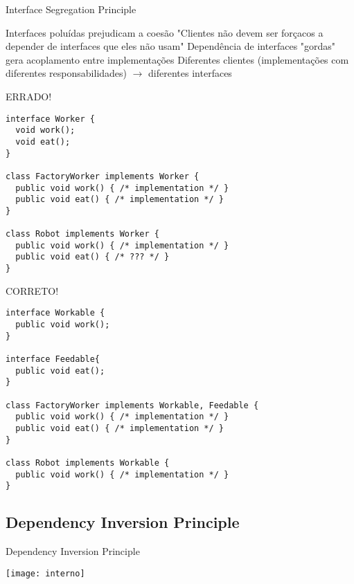 \documentclass{beamer}
\begin{document}
\begin{frame}{Interface Segregation Principle}
 \begin{outline}
   Interfaces poluídas prejudicam a coesão
   "Clientes não devem ser forçacos a depender de interfaces que eles não usam"
     Dependência de interfaces "gordas" gera acoplamento entre implementações
   Diferentes clientes (implementações com diferentes responsabilidades) $\rightarrow$ diferentes interfaces
 \end{outline}
\end{frame}

\begin{frame}[fragile]{ERRADO!}
 \begin{verbatim}
interface Worker {
  void work();
  void eat();
}

class FactoryWorker implements Worker {
  public void work() { /* implementation */ }
  public void eat() { /* implementation */ }
}

class Robot implements Worker {
  public void work() { /* implementation */ }
  public void eat() { /* ??? */ }
}
  \end{verbatim}
\end{frame}

\begin{frame}[fragile]{CORRETO!}
 \begin{verbatim}
interface Workable {
  public void work();
}

interface Feedable{
  public void eat();
}

class FactoryWorker implements Workable, Feedable {
  public void work() { /* implementation */ }
  public void eat() { /* implementation */ }
}

class Robot implements Workable {
  public void work() { /* implementation */ }
}
  \end{verbatim}
\end{frame}

\subsection{Dependency Inversion Principle}

\begin{frame}{Dependency Inversion Principle}
  \begin{center}
    \texttt{[image: interno]}
  \end{center}
\end{frame}
\end{document}
